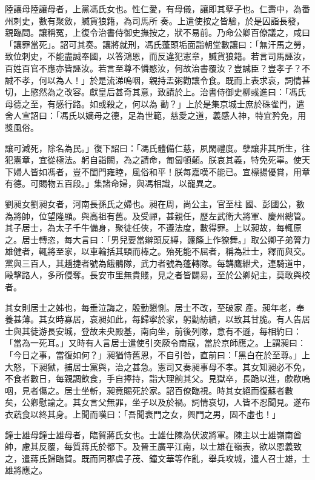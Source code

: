 \begin{pinyinscope}
 陸讓母陸讓母者，上黨馮氏女也。性仁愛，有母儀，讓即其孽子也。仁壽中，為番州刺史，數有聚斂，贓貨狼籍，為司馬所
 奏。上遣使按之皆驗，於是囚詣長發，親臨問。讓稱冤，上復令治書侍御史撫按之，狀不易前。乃命公卿百僚議之，咸曰「讓罪當死」。詔可其奏。讓將就刑，馮氏蓬頭垢面詣朝堂數讓曰：「無汗馬之勞，致位刺史，不能盡誠奉國，以答鴻恩，而反違犯憲章，贓貨狼籍。若言司馬誣汝，百姓百官不應亦皆誣汝。若言至尊不憐愍汝，何故治書覆汝？豈誠臣？豈孝子？不誠不孝，何以為人！」於是流涕嗚咽，親持盂粥勸讓令食。既而上表求哀，詞情甚切，上愍然為之改容。獻皇后甚奇其意，致請於上。治書侍御史柳彧進曰：「馮氏母德之至，有感行路。如或殺之，何以為
 勸？」上於是集京城士庶於硃雀門，遣舍人宣詔曰：「馮氏以嫡母之德，足為世範，慈愛之道，義感人神，特宜矜免，用獎風俗。



 讓可減死，除名為民。」復下詔曰：「馮氏體備仁慈，夙閑禮度。孽讓非其所生，往犯憲章，宜從極法。躬自詣闕，為之請命，匍匐頓顙。朕哀其義，特免死辜。使天下婦人皆如馮者，豈不閨門雍睦，風俗和平！朕每嘉嘆不能已。宜標揚優賞，用章有德。可賜物五百段。」集諸命婦，與馮相識，以寵異之。



 劉昶女劉昶女者，河南長孫氏之婦也。昶在周，尚公主，官至柱
 國、彭國公，數為將帥，位望隆顯。與高祖有舊。及受禪，甚親任，歷左武衛大將軍、慶州總管。其子居士，為太子千牛備身，聚徒任俠，不遵法度，數得罪。上以昶故，每輒原之。居士轉恣，每大言曰：「男兒要當辮頭反縛，籧篨上作獠舞。」取公卿子弟膂力雄健者，輒將至家，以車輪括其頸而棒之。殆死能不屈者，稱為壯士，釋而與交。黨與三百人，其趫捷者號為餓鶻隊，武力者號為蓬轉隊。每韝鷹紲犬，連騎道中，毆擊路人，多所侵奪。長安市里無貴賤，見之者皆闢易，至於公卿妃主，莫敢與校者。



 其女則居士之姊也，每垂泣誨之，殷勤懇惻。居士不改，至破家
 產。昶年老，奉養甚薄。其女時寡居，哀昶如此，每歸寧於家，躬勤紡績，以致其甘脆。有人告居士與其徒游長安城，登故未央殿基，南向坐，前後列隊，意有不遜，每相約曰：「當為一死耳。」又時有人言居士遣使引突厥令南寇，當於京師應之。上謂昶曰：「今日之事，當復如何？」昶猶恃舊恩，不自引咎，直前曰：「黑白在於至尊。」上大怒，下昶獄，捕居士黨與，治之甚急。憲司又奏昶事母不孝。其女知昶必不免，不食者數日，每親調飲食，手自捧持，詣大理餉其父。見獄卒，長跪以進，歔欷嗚咽，見者傷之。居士坐斬，昶竟賜死於家。詔百僚臨視。時其女絕而復蘇者數
 矣，公卿慰諭之。其女言父無罪，坐子以及於禍。詞情哀切，人皆不忍聞見。遂布衣蔬食以終其身。上聞而嘆曰：「吾聞衰門之女，興門之男，固不虛也！」



 鐘士雄母鐘士雄母者，臨賀蔣氏女也。士雄仕陳為伏波將軍。陳主以士雄嶺南酋帥，慮其反覆，每質蔣氏於都下。及晉王廣平江南，以士雄在嶺表，欲以恩義致之，遣蔣氏歸臨賀。既而同郡虞子茂、鐘文華等作亂，舉兵攻城，遣人召士雄，士雄將應之。




\end{pinyinscope}
